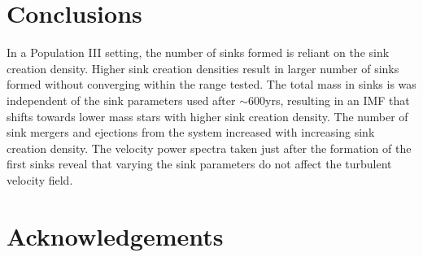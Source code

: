 \documentclass[fleqn,usenatbib]{mnras}
\begin{document}
\section{Conclusions}

In a Population III setting, the number of sinks formed is reliant on the sink creation density. Higher sink creation densities result in larger number of sinks formed without converging within the range tested. The total mass in sinks is was independent of the sink parameters used after $\sim$600yrs, resulting in an IMF that shifts towards lower mass stars with higher sink creation density. The number of sink mergers and ejections from the system increased with increasing sink creation density. The velocity power spectra taken just after the formation of the first sinks reveal that varying the sink parameters do not affect the turbulent velocity field.

\section*{Acknowledgements}





 



















\bsp	%
\label{lastpage}
\end{document}
